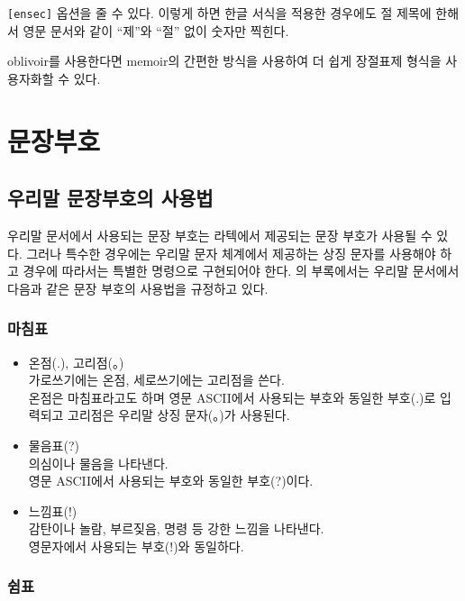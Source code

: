 \과 \는 \texttt{[ensec]}
옵션을 줄 수 있다. 이렇게 하면 한글 서식을 적용한 경우에도
절 제목에 한해서 영문 문서와 같이 ``제''와 ``절'' 없이 숫자만
찍힌다. 

oblivoir를 사용한다면 memoir의 간편한 방식을 사용하여 더 쉽게
장절표제 형식을 사용자화할 수 있다. 

\section{문장부호}

\subsection{우리말 문장부호의 사용법}

우리말 문서에서 사용되는 문장 부호는 라텍에서 제공되는 문장 부호가
사용될 수 있다.  그러나 특수한 경우에는 우리말 문자 체계에서
제공하는 상징 문자를 사용해야 하고 경우에 따라서는 특별한 명령으로
구현되어야 한다.  \cite{Hangul92}의 부록에서는 우리말 문서에서
다음과 같은 문장 부호의 사용법을 규정하고 있다.

\subsubsection{마침표}

\begin{itemize}
\item 온점(.), 고리점(。)\\
  가로쓰기에는 온점, 세로쓰기에는 고리점을 쓴다.\\
  온점은 마침표라고도 하며 영문 ASCII에서 사용되는 부호와 동일한
  부호(.)로 입력되고 고리점은 우리말 상징 문자(。)가 사용된다.\\
\item 물음표(?)\\
  의심이나 물음을 나타낸다.\\
  영문 ASCII에서 사용되는 부호와 동일한 부호(?)이다.\\
\item 느낌표(!)\\
  감탄이나 놀람, 부르짖음, 명령 등 강한 느낌을 나타낸다.\\
  영문자에서 사용되는 부호(!)와 동일하다.\\
\end{itemize}

\subsubsection{쉼표}

